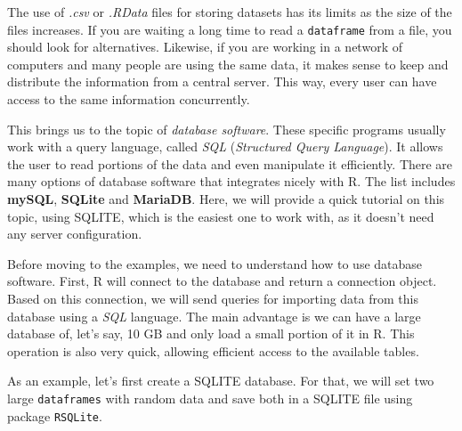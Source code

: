\documentclass[11pt,]{book}
\begin{document}
The use of \emph{.csv} or \emph{.RData} files for storing datasets has
its limits as the size of the files increases. If you are waiting a long
time to read a \texttt{dataframe} from a file, you should look for
alternatives. Likewise, if you are working in a network of computers and
many people are using the same data, it makes sense to keep and
distribute the information from a central server. This way, every user
can have access to the same information concurrently.

This brings us to the topic of \emph{database software}. These specific
programs usually work with a query language, called \emph{SQL}
(\emph{Structured Query Language}). It allows the user to read portions
of the data and even manipulate it efficiently. There are many options
of database software that integrates nicely with R. The list includes
\textbf{mySQL}, \textbf{SQLite} and \textbf{MariaDB}. Here, we will
provide a quick tutorial on this topic, using SQLITE, which is the
easiest one to work with, as it doesn't need any server configuration.
  

Before moving to the examples, we need to understand how to use database
software. First, R will connect to the database and return a connection
object. Based on this connection, we will send queries for importing
data from this database using a \emph{SQL} language. The main advantage
is we can have a large database of, let's say, 10 GB and only load a
small portion of it in R. This operation is also very quick, allowing
efficient access to the available tables.

As an example, let's first create a SQLITE database. For that, we will
set two large \texttt{dataframes} with random data and save both in a
SQLITE file using package \texttt{RSQLite}. 
\end{document}
